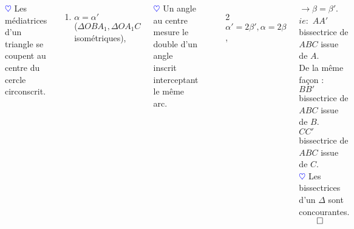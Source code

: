 \documentclass[10pt]{beamer}
\def \heart {\textcolor{blue}{$\heartsuit$} }
\begin{document}
{\begin{columns}[t]
		\onslide<+->\heart Les médiatrices d'un triangle se coupent au centre du cercle circonscrit. \\
		\onslide<+->
			    \begin{enumerate}
			    \item $\alpha = \alpha '$ \\($\Delta OBA_1,\Delta OA_1C$ isométriques),
			    \end{enumerate}	
			    \heart Un angle au centre mesure le double d'un angle inscrit interceptant le même arc.
			    \begin{enumerate}
			    \item[2] $\alpha ' = 2\beta ',\alpha = 2\beta$,
			    \end{enumerate}	
			    $\rightarrow \beta=\beta '$. \\ \smallskip
			    $ie:$ $AA'$ bissectrice de $ABC$ issue de $A$. \\ \smallskip
		\onslide<+-> De la même façon : \\ \smallskip
		$BB'$ bissectrice de $ABC$ issue de $B$. \\ \smallskip
		\onslide<+->$CC'$ bissectrice de $ABC$ issue de $C$. \\ \smallskip
		\heart Les bissectrices d'un $\Delta$ sont concourantes. \hfill $\qed$

   
	   \end{columns}
    
    
    
    }
	  
  
\end{document}

